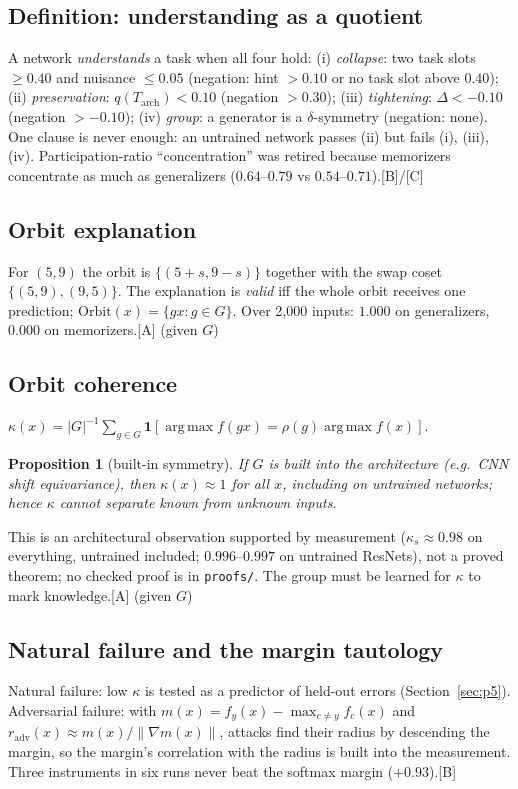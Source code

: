 \documentclass[11pt]{article}
\newtheorem{proposition}{Proposition}
\newcommand{\argmax}{\operatorname*{arg\,max}}
\newcommand{\lev}[1]{\textsc{[#1]}}%
\begin{document}
\subsection{Definition: understanding as a quotient}\label{sec:def}
A network \emph{understands} a task when all four hold: (i) \emph{collapse}: two task slots $\ge 0.40$ and nuisance $\le 0.05$ (negation: hint $>0.10$ or no task slot above $0.40$); (ii) \emph{preservation}: $q(T_{\text{arch}})<0.10$ (negation $>0.30$); (iii) \emph{tightening}: $\Delta<-0.10$ (negation $>-0.10$); (iv) \emph{group}: a generator is a $\delta$-symmetry (negation: none). One clause is never enough: an untrained network passes (ii) but fails (i), (iii), (iv). Participation-ratio ``concentration'' was retired because memorizers concentrate as much as generalizers ($0.64$--$0.79$ vs $0.54$--$0.71$).\hfill\lev{B}/\lev{C}

\subsection{Orbit explanation}
For $(5,9)$ the orbit is $\{(5+s,9-s)\}$ together with the swap coset $\{(5,9),(9,5)\}$. The explanation is \emph{valid} iff the whole orbit receives one prediction; $\mathrm{Orbit}(x)=\{gx:g\in G\}$. Over 2{,}000 inputs: $1.000$ on generalizers, $0.000$ on memorizers.\hfill\lev{A} (given $G$)

\subsection{Orbit coherence}
$\kappa(x)=|G|^{-1}\sum_{g\in G}\mathbf 1[\argmax f(gx)=\rho(g)\argmax f(x)]$.
\begin{proposition}[built-in symmetry]\label{prop:builtin}
If $G$ is built into the architecture (e.g.\ CNN shift equivariance), then $\kappa(x)\approx1$ for all $x$, including on untrained networks; hence $\kappa$ cannot separate known from unknown inputs.
\end{proposition}
This is an architectural observation supported by measurement ($\kappa_s\approx0.98$ on everything, untrained included; $0.996$--$0.997$ on untrained ResNets), not a proved theorem; no checked proof is in \texttt{proofs/}. The group must be learned for $\kappa$ to mark knowledge.\hfill\lev{A} (given $G$)

\subsection{Natural failure and the margin tautology}
Natural failure: low $\kappa$ is tested as a predictor of held-out errors (Section~\ref{sec:p5}). Adversarial failure: with $m(x)=f_y(x)-\max_{c\ne y}f_c(x)$ and $r_{\text{adv}}(x)\approx m(x)/\|\nabla m(x)\|$, attacks find their radius by descending the margin, so the margin's correlation with the radius is built into the measurement. Three instruments in six runs never beat the softmax margin ($+0.93$).\hfill\lev{B}
\end{document}
